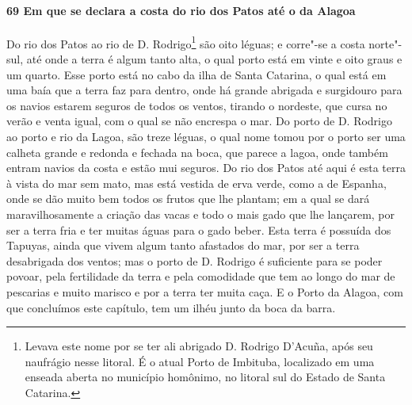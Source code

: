 \begin{linenumbers}
\paragraph{69 Em que se declara a costa do rio dos Patos até o da Alagoa} \quad
Do rio dos Patos ao rio de D. Rodrigo\footnote{ Levava este nome por se ter ali abrigado
D. Rodrigo D’Acuña, após seu naufrágio nesse litoral. É o atual Porto de Imbituba,
localizado em uma enseada aberta no município homônimo, no litoral sul do Estado de Santa
Catarina.} são oito léguas; e corre"-se a costa norte"-sul, até onde a terra é algum tanto
alta, o qual porto está em vinte e oito graus e um quarto. Esse porto está no cabo da ilha
de Santa Catarina, o qual está em uma baía que a terra faz para dentro, onde há grande
abrigada e surgidouro para os navios estarem seguros de todos os ventos, tirando o
nordeste, que cursa no verão e venta igual, com o qual se não encrespa o mar. Do porto de
D. Rodrigo ao porto e rio da Lagoa, são treze léguas, o qual nome tomou por o porto ser
uma calheta grande e redonda e fechada na boca, que parece a lagoa, onde também entram
navios da costa e estão mui seguros. Do rio dos Patos até aqui é esta terra à vista do mar
sem mato, mas está vestida de erva verde, como a de Espanha, onde se dão muito bem todos
os frutos que lhe plantam; em a qual se dará maravilhosamente a criação das vacas e todo o
mais gado que lhe lançarem, por ser a terra fria e ter muitas águas para o gado beber.
Esta terra é possuída dos Tapuyas, ainda que vivem algum tanto afastados do mar, por ser a
terra desabrigada dos ventos; mas o porto de D. Rodrigo é suficiente para se poder povoar,
pela fertilidade da terra e pela comodidade que tem ao longo do mar de pescarias e muito
marisco e por a terra ter muita caça. E o Porto da Alagoa, com que concluímos este
capítulo, tem um ilhéu junto da boca da barra.


\end{linenumbers}
